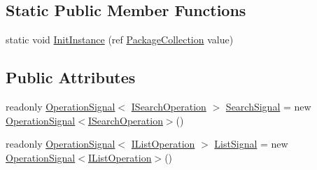 \subsection*{Static Public Member Functions}
\begin{DoxyCompactItemize}
\item 
static void \mbox{\hyperlink{class_unity_editor_1_1_package_manager_1_1_u_i_1_1_package_collection_ad4f8e8391ee918c13e8a7afb888a5b66}{Init\+Instance}} (ref \mbox{\hyperlink{class_unity_editor_1_1_package_manager_1_1_u_i_1_1_package_collection}{Package\+Collection}} value)
\end{DoxyCompactItemize}
\subsection*{Public Attributes}
\begin{DoxyCompactItemize}
\item 
readonly \mbox{\hyperlink{class_unity_editor_1_1_package_manager_1_1_u_i_1_1_operation_signal}{Operation\+Signal}}$<$ \mbox{\hyperlink{interface_unity_editor_1_1_package_manager_1_1_u_i_1_1_i_search_operation}{I\+Search\+Operation}} $>$ \mbox{\hyperlink{class_unity_editor_1_1_package_manager_1_1_u_i_1_1_package_collection_a0ae7851281d0246d8c715db1e3b10a63}{Search\+Signal}} = new \mbox{\hyperlink{class_unity_editor_1_1_package_manager_1_1_u_i_1_1_operation_signal}{Operation\+Signal}}$<$\mbox{\hyperlink{interface_unity_editor_1_1_package_manager_1_1_u_i_1_1_i_search_operation}{I\+Search\+Operation}}$>$()
\item 
readonly \mbox{\hyperlink{class_unity_editor_1_1_package_manager_1_1_u_i_1_1_operation_signal}{Operation\+Signal}}$<$ \mbox{\hyperlink{interface_unity_editor_1_1_package_manager_1_1_u_i_1_1_i_list_operation}{I\+List\+Operation}} $>$ \mbox{\hyperlink{class_unity_editor_1_1_package_manager_1_1_u_i_1_1_package_collection_a6859e240ee04e416808e527b11107775}{List\+Signal}} = new \mbox{\hyperlink{class_unity_editor_1_1_package_manager_1_1_u_i_1_1_operation_signal}{Operation\+Signal}}$<$\mbox{\hyperlink{interface_unity_editor_1_1_package_manager_1_1_u_i_1_1_i_list_operation}{I\+List\+Operation}}$>$()
\end{DoxyCompactItemize}
